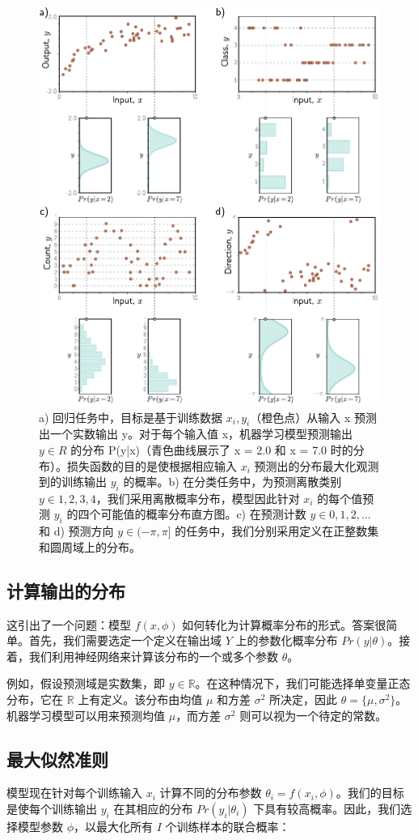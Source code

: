 \documentclass[lang=cn,newtx,10pt,scheme=chinese]{elegantbook}
\begin{document}
\begin{figure}[ht!]
	\centering
	\includegraphics[width=0.7\linewidth]{PDFFigures/UDLChap5PDF/LossDataTypes.pdf}
	\caption{a) 回归任务中，目标是基于训练数据 \({x_i,y_i}\)（橙色点）从输入 x 预测出一个实数输出 y。对于每个输入值 x，机器学习模型预测输出 \(y \in R\) 的分布 P(y|x)（青色曲线展示了 x = 2.0 和 x = 7.0 时的分布）。损失函数的目的是使根据相应输入 \(x_i\) 预测出的分布最大化观测到的训练输出 \(y_i\) 的概率。b) 在分类任务中，为预测离散类别 \(y \in {1, 2, 3, 4}\)，我们采用离散概率分布，模型因此针对 \(x_i\) 的每个值预测 \(y_i\) 的四个可能值的概率分布直方图。c) 在预测计数 \(y \in {0, 1, 2, ...}\) 和 d) 预测方向 \(y \in (−\pi, \pi]\) 的任务中，我们分别采用定义在正整数集和圆周域上的分布。}
\end{figure}


\subsection{计算输出的分布}
这引出了一个问题：模型 \(f(x, \phi)\) 如何转化为计算概率分布的形式。答案很简单。首先，我们需要选定一个定义在输出域 \(Y\) 上的参数化概率分布 \(Pr(y|\theta)\)。接着，我们利用神经网络来计算该分布的一个或多个参数 \(\theta\)。

例如，假设预测域是实数集，即 \(y \in \mathbb{R}\)。在这种情况下，我们可能选择单变量正态分布，它在 \(\mathbb{R}\) 上有定义。该分布由均值 \(\mu\) 和方差 \(\sigma^2\) 所决定，因此 \(\theta = \{\mu, \sigma^2\}\)。机器学习模型可以用来预测均值 \(\mu\)，而方差 \(\sigma^2\) 则可以视为一个待定的常数。
\subsection{最大似然准则}
模型现在针对每个训练输入 \(x_i\) 计算不同的分布参数 \(\theta_i = f(x_i, \phi)\)。我们的目标是使每个训练输出 \(y_i\) 在其相应的分布 \(Pr(y_i|\theta_i)\) 下具有较高概率。因此，我们选择模型参数 \(\phi\)，以最大化所有 \(I\) 个训练样本的联合概率：
\end{document}
